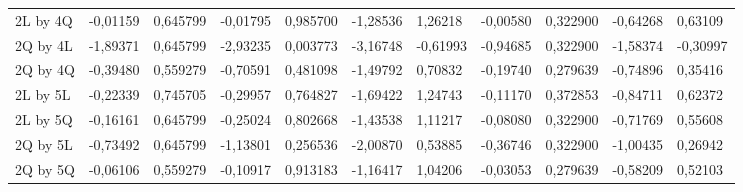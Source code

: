 \begin{table}[H]
{\begin{tabular}{lllllllllll}
\rowcolor[HTML]{FFFFFF} 
2L by 4Q       & {\color[HTML]{181A1B} -0,01159} & {\color[HTML]{181A1B} 0,645799} & {\color[HTML]{181A1B} -0,01795} & {\color[HTML]{181A1B} 0,985700} & {\color[HTML]{181A1B} -1,28536} & {\color[HTML]{181A1B} 1,26218}  & {\color[HTML]{181A1B} -0,00580} & {\color[HTML]{181A1B} 0,322900} & {\color[HTML]{181A1B} -0,64268} & {\color[HTML]{181A1B} 0,63109}  \\
\rowcolor[HTML]{FFFFFF} 
2Q by 4L       & {\color[HTML]{FF0000} -1,89371} & {\color[HTML]{FF0000} 0,645799} & {\color[HTML]{FF0000} -2,93235} & {\color[HTML]{FF0000} 0,003773} & {\color[HTML]{FF0000} -3,16748} & {\color[HTML]{FF0000} -0,61993} & {\color[HTML]{FF0000} -0,94685} & {\color[HTML]{FF0000} 0,322900} & {\color[HTML]{FF0000} -1,58374} & {\color[HTML]{FF0000} -0,30997} \\
\rowcolor[HTML]{FFFFFF} 
2Q by 4Q       & {\color[HTML]{181A1B} -0,39480} & {\color[HTML]{181A1B} 0,559279} & {\color[HTML]{181A1B} -0,70591} & {\color[HTML]{181A1B} 0,481098} & {\color[HTML]{181A1B} -1,49792} & {\color[HTML]{181A1B} 0,70832}  & {\color[HTML]{181A1B} -0,19740} & {\color[HTML]{181A1B} 0,279639} & {\color[HTML]{181A1B} -0,74896} & {\color[HTML]{181A1B} 0,35416}  \\
\rowcolor[HTML]{FFFFFF} 
2L by 5L       & {\color[HTML]{181A1B} -0,22339} & {\color[HTML]{181A1B} 0,745705} & {\color[HTML]{181A1B} -0,29957} & {\color[HTML]{181A1B} 0,764827} & {\color[HTML]{181A1B} -1,69422} & {\color[HTML]{181A1B} 1,24743}  & {\color[HTML]{181A1B} -0,11170} & {\color[HTML]{181A1B} 0,372853} & {\color[HTML]{181A1B} -0,84711} & {\color[HTML]{181A1B} 0,62372}  \\
\rowcolor[HTML]{FFFFFF} 
2L by 5Q       & {\color[HTML]{181A1B} -0,16161} & {\color[HTML]{181A1B} 0,645799} & {\color[HTML]{181A1B} -0,25024} & {\color[HTML]{181A1B} 0,802668} & {\color[HTML]{181A1B} -1,43538} & {\color[HTML]{181A1B} 1,11217}  & {\color[HTML]{181A1B} -0,08080} & {\color[HTML]{181A1B} 0,322900} & {\color[HTML]{181A1B} -0,71769} & {\color[HTML]{181A1B} 0,55608}  \\
\rowcolor[HTML]{FFFFFF} 
2Q by 5L       & {\color[HTML]{181A1B} -0,73492} & {\color[HTML]{181A1B} 0,645799} & {\color[HTML]{181A1B} -1,13801} & {\color[HTML]{181A1B} 0,256536} & {\color[HTML]{181A1B} -2,00870} & {\color[HTML]{181A1B} 0,53885}  & {\color[HTML]{181A1B} -0,36746} & {\color[HTML]{181A1B} 0,322900} & {\color[HTML]{181A1B} -1,00435} & {\color[HTML]{181A1B} 0,26942}  \\
\rowcolor[HTML]{FFFFFF} 
2Q by 5Q       & {\color[HTML]{181A1B} -0,06106} & {\color[HTML]{181A1B} 0,559279} & {\color[HTML]{181A1B} -0,10917} & {\color[HTML]{181A1B} 0,913183} & {\color[HTML]{181A1B} -1,16417} & {\color[HTML]{181A1B} 1,04206}  & {\color[HTML]{181A1B} -0,03053} & {\color[HTML]{181A1B} 0,279639} & {\color[HTML]{181A1B} -0,58209} & {\color[HTML]{181A1B} 0,52103}  \\

\end{tabular}}
\end{table}
